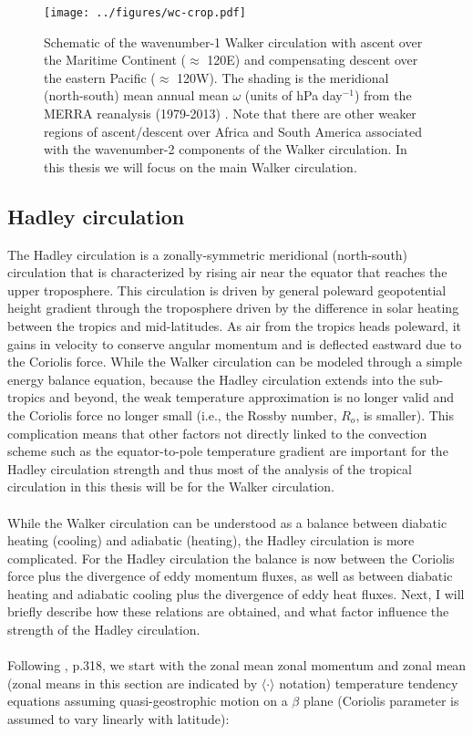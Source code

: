 \documentclass[letterpaper,12pt,titlepage,oneside,final]{book}
\begin{document}
\begin{figure}[H]
\centering
\noindent\texttt{[image: ../figures/wc-crop.pdf]}\hfill
\caption{Schematic of the wavenumber-1 Walker circulation with ascent over the Maritime Continent ($\approx$ 120E) and compensating descent over the eastern Pacific ($\approx$ 120W). The shading is the meridional (north-south) mean annual mean $\omega$ (units of hPa day$^{-1}$) from the MERRA reanalysis (1979-2013) \citep{rienecker_merra:_2011}. Note that there are other weaker regions of ascent/descent over Africa and South America associated with the wavenumber-2 components of the Walker circulation. In this thesis we will focus on the main Walker circulation.}
\label{fig:WC}
\end{figure}

\subsection{Hadley circulation}\label{HC}

The Hadley circulation is a zonally-symmetric meridional (north-south) circulation that is characterized by rising air near the equator that reaches the upper troposphere. This circulation is driven by general poleward geopotential height gradient through the troposphere driven by the difference in solar heating between the tropics and mid-latitudes. As air from the tropics heads poleward, it gains in velocity to conserve angular momentum and is deflected eastward due to the Coriolis force. While the Walker circulation can be modeled through a simple energy balance equation, because the Hadley circulation extends into the sub-tropics and beyond, the weak temperature approximation is no longer valid and the Coriolis force no longer small (i.e., the Rossby number, $R_{o}$, is smaller). This complication means that other factors not directly linked to the convection scheme such as the equator-to-pole temperature gradient are important for the Hadley circulation strength and thus most of the analysis of the tropical circulation in this thesis will be for the Walker circulation.
\\
\\
While the Walker circulation can be understood as a balance between diabatic heating (cooling) and adiabatic (heating), the Hadley circulation is more complicated. For the Hadley circulation the balance is now between the Coriolis force plus the divergence of eddy momentum fluxes, as well as between diabatic heating and adiabatic cooling plus the divergence of eddy heat fluxes. Next, I will briefly describe how these relations are obtained, and what factor influence the strength of the Hadley circulation. 
\\
\\
Following \citep{holton_introduction_2004}, p.318, we start with the zonal mean zonal momentum and zonal mean (zonal means in this section are indicated by $\langle \cdot \rangle$ notation) temperature tendency equations assuming quasi-geostrophic motion on a $\beta$ plane (Coriolis parameter is assumed to vary linearly with latitude):
\end{document}
